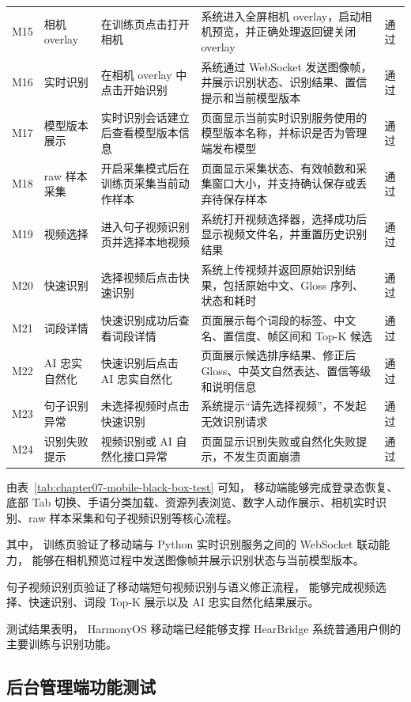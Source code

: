 \begin{longtable}{L{0.08\textwidth} L{0.18\textwidth} L{0.24\textwidth} L{0.28\textwidth} L{0.12\textwidth}}
  M15 & 相机 overlay & 在训练页点击打开相机 & 系统进入全屏相机 overlay，启动相机预览，并正确处理返回键关闭 overlay & 通过 \\
  M16 & 实时识别 & 在相机 overlay 中点击开始识别 & 系统通过 WebSocket 发送图像帧，并展示识别状态、识别结果、置信提示和当前模型版本 & 通过 \\
  M17 & 模型版本展示 & 实时识别会话建立后查看模型版本信息 & 页面显示当前实时识别服务使用的模型版本名称，并标识是否为管理端发布模型 & 通过 \\
  M18 & raw 样本采集 & 开启采集模式后在训练页采集当前动作样本 & 页面显示采集状态、有效帧数和采集窗口大小，并支持确认保存或丢弃待保存样本 & 通过 \\
  M19 & 视频选择 & 进入句子视频识别页并选择本地视频 & 系统打开视频选择器，选择成功后显示视频文件名，并重置历史识别结果 & 通过 \\
  M20 & 快速识别 & 选择视频后点击快速识别 & 系统上传视频并返回原始识别结果，包括原始中文、Gloss 序列、状态和耗时 & 通过 \\
  M21 & 词段详情 & 快速识别成功后查看词段详情 & 页面展示每个词段的标签、中文名、置信度、帧区间和 Top-K 候选 & 通过 \\
  M22 & AI 忠实自然化 & 快速识别后点击 AI 忠实自然化 & 页面展示候选排序结果、修正后 Gloss、中英文自然表达、置信等级和说明信息 & 通过 \\
  M23 & 句子识别异常 & 未选择视频时点击快速识别 & 系统提示“请先选择视频”，不发起无效识别请求 & 通过 \\
  M24 & 识别失败提示 & 视频识别或 AI 自然化接口异常 & 页面显示识别失败或自然化失败提示，不发生页面崩溃 & 通过 \\
  \bottomrule
\end{longtable}

由表~\ref{tab:chapter07-mobile-black-box-test} 可知，
移动端能够完成登录态恢复、底部 Tab 切换、手语分类加载、资源列表浏览、数字人动作展示、相机实时识别、raw 样本采集和句子视频识别等核心流程。

其中，
训练页验证了移动端与 Python 实时识别服务之间的 WebSocket 联动能力，
能够在相机预览过程中发送图像帧并展示识别状态与当前模型版本。

句子视频识别页验证了移动端短句视频识别与语义修正流程，
能够完成视频选择、快速识别、词段 Top-K 展示以及 AI 忠实自然化结果展示。

测试结果表明，
HarmonyOS 移动端已经能够支撑 HearBridge 系统普通用户侧的主要训练与识别功能。

\subsection{后台管理端功能测试}

